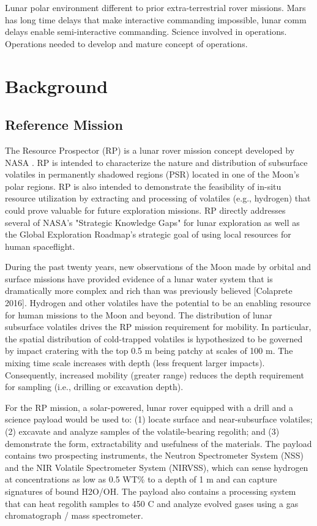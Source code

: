 \documentclass[twocolumn,letterpaper]{IEEEAerospaceCLS}  %
\begin{document}
Lunar polar environment different to prior extra-terrestrial rover missions. Mars has long time delays that make interactive commanding impossible, lunar comm delays enable semi-interactive commanding. Science involved in operations. Operations needed to develop and mature concept of operations.  

\section{Background}
\label{sec:background}

\subsection{Reference Mission}
The Resource Prospector (RP) is a lunar rover mission concept developed by NASA \cite{andrews2015resource,colaprete2015resource}. 
RP is intended to characterize the nature and distribution of subsurface volatiles in permanently shadowed regions (PSR) located in one of the Moon's polar regions. 
RP is also intended to demonstrate the feasibility of in-situ resource utilization by extracting and processing of volatiles (e.g., hydrogen) that could prove valuable for future exploration missions. 
RP directly addresses several of NASA's "Strategic Knowledge Gaps" for lunar exploration as well as the Global Exploration Roadmap's strategic goal of using local resources for human spaceflight.

During the past twenty years, new observations of the Moon made by orbital and surface missions have provided evidence of a lunar water system that is dramatically more complex and rich than was previously believed [Colaprete 2016]. 
Hydrogen and other volatiles have the potential to be an enabling resource for human missions to the Moon and beyond. 
The distribution of lunar subsurface volatiles drives the RP mission requirement for mobility. 
In particular, the spatial distribution of cold-trapped volatiles is hypothesized to be governed by impact cratering with the top 0.5 m being patchy at scales of 100 m. 
The mixing time scale increases with depth (less frequent larger impacts). 
Consequently, increased mobility (greater range) reduces the depth requirement for sampling (i.e., drilling or excavation depth).

For the RP mission, a solar-powered, lunar rover equipped with a drill and a science payload would be used to: (1) locate surface and near-subsurface volatiles; (2) excavate and analyze samples of the volatile-bearing regolith; and (3) demonstrate the form, extractability and usefulness of the materials. 
The payload contains two prospecting instruments, the Neutron Spectrometer System (NSS) and the NIR Volatile Spectrometer System (NIRVSS), which can sense hydrogen at concentrations as low as 0.5 WT\% to a depth of 1 m and can capture signatures of bound H2O/OH. 
The payload also contains a processing system that can heat regolith samples to 450 C and analyze evolved gases using a gas chromatograph / mass spectrometer.
\end{document}
